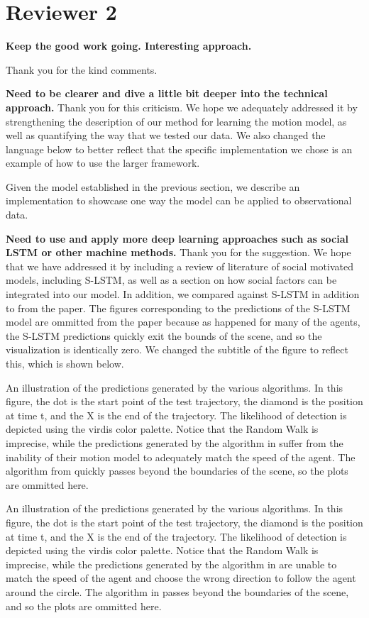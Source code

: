 \documentclass[usenames,dvipsnames]{article}
\providecommand{\response}[1]{
\noindent
\noindent\colorbox{gray!20}{
\parbox{\textwidth}{
\setlength{\parskip}{.1in}
\setlength{\parindent}{.1in}
#1}
}
}
\begin{document}
\section*{Reviewer 2}
\begin{enumerate}
\begin{item}
\textbf{Keep the good work going. Interesting approach.}
\end{item}

Thank you for the kind comments.
\begin{item}
\textbf{
Need to be clearer and
dive a little bit deeper into the technical approach. }
Thank you for this criticism. We hope we adequately addressed it by strengthening the description of our method for learning the motion model, as well as quantifying the way that we tested our data. We also changed the language below to better reflect that the specific implementation we chose is an example of how to use the larger framework.

\response{Given the model established in the previous section, we describe an implementation to showcase one way the model can be applied to observational data.}
\end{item}
\begin{item}
\textbf{
Need to use and apply more deep learning approaches such as social LSTM
or other machine methods.}
Thank you for the suggestion. We hope that we have addressed it by including a review of literature of social motivated models, including S-LSTM, as well as a section on how social factors can be integrated into our model. In addition, we compared against S-LSTM in addition to \cite{Kitani2012} from the paper. The figures corresponding to the predictions of the S-LSTM model are ommitted from the paper because as happened for many of the agents, the S-LSTM predictions quickly exit the bounds of the scene, and so the visualization is identically zero. We changed the subtitle of the figure to reflect this, which is shown below.

\response{An illustration of the predictions generated by the various algorithms. In this figure, the dot is the start point of the test trajectory, the diamond is the position at time t, and the X is the end of the trajectory. The likelihood of detection is depicted using the virdis color palette. Notice that the Random Walk is imprecise, while the predictions generated by the algorithm in \cite{Kitani2012} suffer from the inability of their motion model to adequately match the speed of the agent. The algorithm from \cite{Alahi2016} quickly passes beyond the boundaries of the scene, so the plots are ommitted here.
}
\response{An illustration of the predictions generated by the various algorithms. In this figure, the dot is the start point of the test trajectory, the diamond is the position at time t, and the X is the end of the trajectory. The likelihood of detection is depicted using the virdis color palette. Notice that the Random Walk is imprecise, while the predictions generated by the algorithm in \cite{Kitani2012} are unable to match the speed of the agent and choose the wrong direction to follow the agent around the circle. The algorithm in \cite{Alahi2016} passes beyond the boundaries of the scene, and so the plots are ommitted here.}


\end{item}
\end{enumerate}
\end{document}
